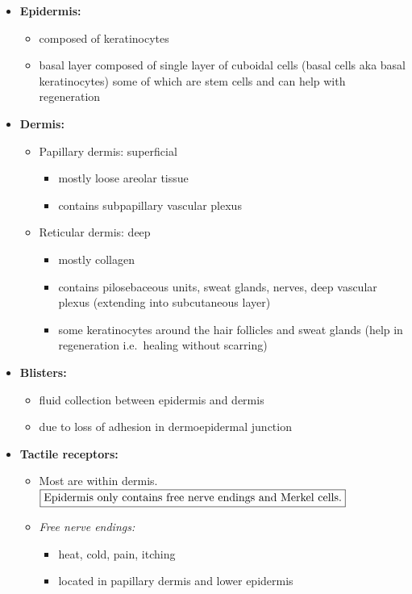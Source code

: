 \documentclass[
  12pt,
]{memoir}
\providecommand{\tightlist}{%
  \setlength{\itemsep}{0pt}\setlength{\parskip}{0pt}}
\begin{document}
\begin{itemize}
\tightlist
\item
  \textbf{Epidermis:}

  \begin{itemize}
  \tightlist
  \item
    composed of keratinocytes
  \item
    basal layer composed of single layer of cuboidal cells (basal cells
    aka basal keratinocytes) some of which are stem cells and can help
    with regeneration
  \end{itemize}
\item
  \textbf{Dermis:}

  \begin{itemize}
  \tightlist
  \item
    Papillary dermis: superficial

    \begin{itemize}
    \tightlist
    \item
      mostly loose areolar tissue
    \item
      contains subpapillary vascular plexus
    \end{itemize}
  \item
    Reticular dermis: deep

    \begin{itemize}
    \tightlist
    \item
      mostly collagen
    \item
      contains pilosebaceous units, sweat glands, nerves, deep vascular
      plexus (extending into subcutaneous layer)
    \item
      some keratinocytes around the hair follicles and sweat glands
      (help in regeneration i.e.~healing without scarring)
    \end{itemize}
  \end{itemize}
\item
  \textbf{Blisters:}

  \begin{itemize}
  \tightlist
  \item
    fluid collection between epidermis and dermis
  \item
    due to loss of adhesion in dermoepidermal junction
  \end{itemize}
\item
  \textbf{Tactile receptors:}

  \begin{itemize}
  \tightlist
  \item
    Most are within dermis.
    \(\fbox{Epidermis only contains free nerve endings  and Merkel cells.}\)
  \item
    \emph{Free nerve endings:}

    \begin{itemize}
    \tightlist
    \item
      heat, cold, pain, itching
    \item
      located in papillary dermis and lower epidermis
    \end{itemize}
  \end{itemize}
\end{itemize}
\end{document}
